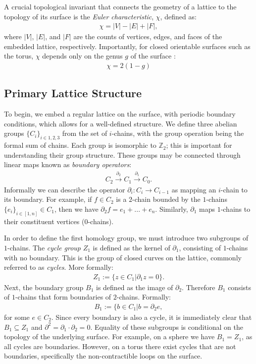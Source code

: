 \documentclass[12pt]{article}
\theoremstyle{definition}
\begin{document}
A crucial topological invariant that connects the geometry of a lattice to the topology of its surface is the \emph{Euler characteristic}, $\chi$, defined as:
    \begin{align}
        \chi = |V|-|E|+|F|,
    \end{align}
where $|V|$, $|E|$, and $|F|$ are the counts of vertices, edges, and faces of the embedded lattice, respectively. Importantly, for closed orientable surfaces such as the torus, $\chi$ depends only on the genus $g$ of the surface \cite{gtf}:
    \begin{align}
        \chi = 2(1-g)
    \end{align}

\subsection{Primary Lattice Structure}
To begin, we embed a regular lattice on the surface, with periodic boundary conditions, which allows for a well-defined structure. We define three abelian groups $\{C_i\}_{i\in{1,2,3}}$ from the set of $i$-chains, with the group operation being the formal sum of chains. Each group is isomorphic to $\mathbb{Z}_2$; this is important for understanding their group structure. These groups may be connected through linear maps known as \emph{boundary operators}:
    \begin{align}
        C_2 \xrightarrow{\partial_2} C_1 \xrightarrow{\partial_1} C_0.
    \end{align}
Informally we can describe the operator $\partial_i:C_i\rightarrow C_{i-1}$ as mapping an $i$-chain to its boundary. For example, if $f\in C_2$ is a $2$-chain bounded by the $1$-chains $\{e_i\}_{i\in [1,n]}\in C_1$, then we have $\partial_2 f = e_1+...+e_n$. Similarly, $\partial_1$ maps $1$-chains to their constituent vertices ($0$-chains).\newline

In order to define the first homology group, we must introduce two subgroups of $1$-chains. The \emph{cycle group} $Z_1$ is defined as the kernel of $\partial_1$, consisting of $1$-chains with no boundary. This is the group of closed curves on the lattice, commonly referred to as \emph{cycles}. More formally:
    \begin{align}
       Z_1 := \{z\in C_1| \partial_1 z = 0\}.
    \end{align}
Next, the boundary group $B_1$ is defined as the image of $\partial_2$. Therefore $B_1$ consists of $1$-chains that form boundaries of $2$-chains. Formally:
    \begin{align}
        B_1 := \{b\in C_1 | b = \partial_2 e,
    \end{align}
for some $e\in C_2$. Since every boundary is also a cycle, it is immediately clear that $B_1 \subseteq Z_1$ and $\partial^2 = \partial_1\cdot\partial_2 = 0$. Equality of these subgroups is conditional on the topology of the underlying surface. For example, on a sphere we have $B_1 = Z_1$, as all cycles are boundaries. However, on a torus there exist cycles that are not boundaries, specifically the non-contractible loops on the surface.
\end{document}
